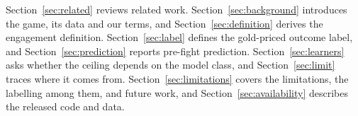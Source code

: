 Section~\ref{sec:related} reviews related work. Section~\ref{sec:background} introduces the game,
its data and our terms, and Section~\ref{sec:definition} derives the engagement definition.
Section~\ref{sec:label} defines the gold-priced outcome label, and
Section~\ref{sec:prediction} reports pre-fight prediction. Section~\ref{sec:learners} asks
whether the ceiling depends on the model class, and Section~\ref{sec:limit} traces where it
comes from. Section~\ref{sec:limitations} covers the limitations, the labelling among them, and
future work, and Section~\ref{sec:availability} describes the released code and data.
